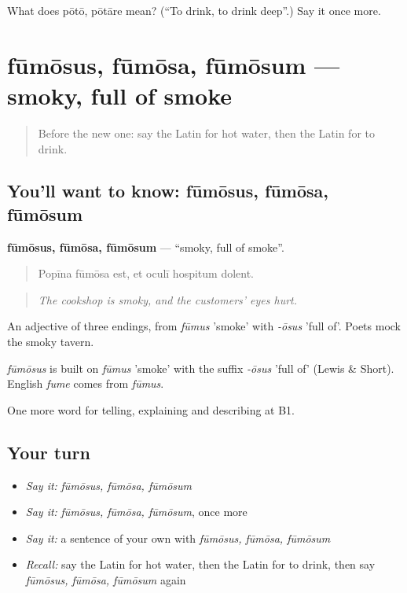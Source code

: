 \begin{tcolorbox}[breakable,colback=teal!4,colframe=teal!35!black,title={Before you move on}]
What does pōtō, pōtāre mean? (\textquotedblleft{}To drink, to drink deep\textquotedblright{}.) Say it once more.
\end{tcolorbox}
\section[fūmōsus, fūmōsa, fūmōsum]{fūmōsus, fūmōsa, fūmōsum — smoky, full of smoke}

\label{lesson:LA-C461-fumosus}



\begin{quote}
Before the new one: say the Latin for hot water, then the Latin for to drink.
\end{quote}

\subsection*{You'll want to know: fūmōsus, fūmōsa, fūmōsum}
\textbf{fūmōsus, fūmōsa, fūmōsum} — \textquotedblleft{}smoky, full of smoke\textquotedblright{}.

\begin{quote}
Popīna fūmōsa est, et oculī hospitum dolent.
\end{quote}

\begin{quote}
\emph{The cookshop is smoky, and the customers' eyes hurt.}
\end{quote}

An adjective of three endings, from \emph{fūmus} 'smoke' with \emph{-ōsus} 'full of'. Poets mock the smoky tavern.

\begin{cousinweb}
\emph{fūmōsus} is built on \emph{fūmus} 'smoke' with the suffix \emph{-ōsus} 'full of' (Lewis \& Short). English \emph{fume} comes from \emph{fūmus}.
\end{cousinweb}

\begin{grammarlens}[title={What you've built}]
One more word for telling, explaining and describing at B1.
\end{grammarlens}

\subsection*{Your turn}
\begin{itemize}
\raggedright
  \item \emph{Say it:} \emph{fūmōsus, fūmōsa, fūmōsum}
  \item \emph{Say it:} \emph{fūmōsus, fūmōsa, fūmōsum}, once more
  \item \emph{Say it:} a sentence of your own with \emph{fūmōsus, fūmōsa, fūmōsum}
  \item \emph{Recall:} say the Latin for hot water, then the Latin for to drink, then say \emph{fūmōsus, fūmōsa, fūmōsum} again
\end{itemize}

